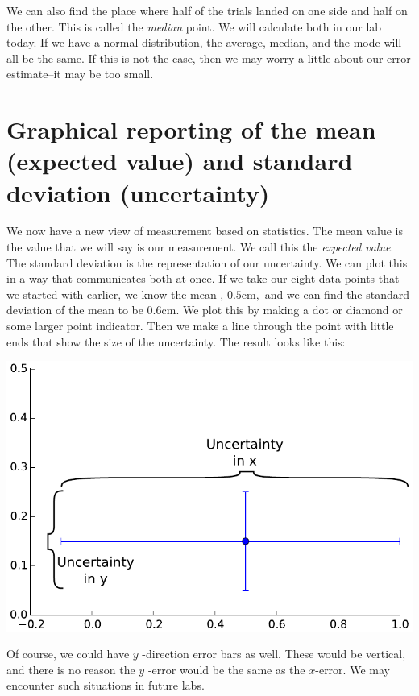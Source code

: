 \documentclass[twoside,11pt,ShortChapTitles]{BYUTextbook}
\begin{document}
We can also find the place where half of the trials landed on one side and
half on the other. This is called the \emph{median} point. We will calculate
both in our lab today. If we have a normal distribution, the average,
median, and the mode will all be the same. If this is not the case, then we
may worry a little about our error estimate--it may be too small.

\section{Graphical reporting of the mean (expected value) and standard
deviation (uncertainty)}

We now have a new view of measurement based on statistics. The mean value is
the value that we will say is our measurement. We call this the \emph{%
expected value}. The standard deviation is the representation of our
uncertainty. We can plot this in a way that communicates both at once. If we
take our eight data points that we started with earlier, we know the mean , $%
0.5\text{cm},$ and we can find the standard deviation of the mean to be $0.6%
\text{cm}.$ We plot this by making a dot or diamond or some larger point
indicator. Then we make a line through the point with little ends that show
the size of the uncertainty. The result looks like this:

\begin{center}
\includegraphics[scale=0.6]{Lab2_figs/error_bars.pdf}
\end{center}



Of course, we could have $y$
-direction error bars as well. These would be vertical, and there is no reason the $y$%
-error would be the same as the $x$-error. We may encounter such situations
in future labs.
\end{document}
